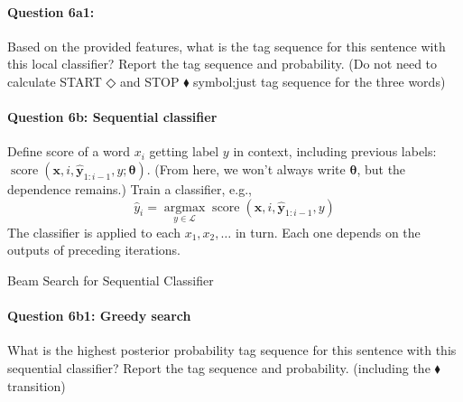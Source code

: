 \documentclass[10pt]{article}
\newcommand{\bDiamond}{\mathbin{\Diamond}}
\begin{document}
\paragraph{Question 6a1:} Based on the provided features, what is the tag sequence for this sentence with this local classifier? Report the tag sequence and probability. (Do not need to calculate START $\bDiamond$ and STOP $\blacklozenge$ symbol;just tag sequence for the three words)

\newpage

\paragraph{Question 6b: Sequential classifier}

Define score of a word $x_i$ getting label $y$ in context, including previous labels: $\operatorname{score}\left(\boldsymbol{x}, i, \hat{\boldsymbol{y}}_{1: i-1}, y ; \boldsymbol{\theta}\right)$. (From here, we won't always write $\boldsymbol{\theta}$, but the dependence remains.)
Train a classifier, e.g.,
$$
  \hat{y}_i=\underset{y \in \mathcal{L}}{\operatorname{argmax}} \operatorname{score}\left(\boldsymbol{x}, i, \hat{\boldsymbol{y}}_{1: i-1}, y\right)
$$
The classifier is applied to each $x_1, x_2, \ldots$ in turn. Each one depends on the outputs of preceding iterations.



\begin{algorithm}
  \caption{Beam Search for Sequential Classifier}  \label{algo:beam}
\end{algorithm}

\paragraph{Question 6b1: Greedy search} What is the highest posterior probability tag sequence for this sentence with this sequential classifier? Report the tag sequence and probability. (including the $\blacklozenge$ transition)
\end{document}
